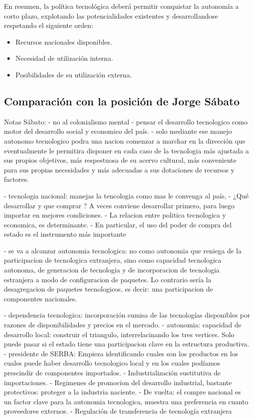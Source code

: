 En resumen, la política tecnológica deberá permitir conquistar la autonomía a corto
plazo, explotando las potencialidades existentes y desarrollandose respetando el siguiente orden:
\begin{itemize}
    \item Recursos nacionales disponibles.
    \item Necesidad de utilización interna.
    \item Posibilidades de su utilización externa.
\end{itemize}

\subsection*{Comparación con la posición de Jorge Sábato}

Notas Sábato:
- no al colonialismo mental
- pensar el desarrollo tecnologico como motor del desarrollo social y economico del país.
- solo mediante ese manejo autonomo tecnologico podra una nacion comenzar a marchar
    en la dirección que eventualmente le permitira disponer en cada caso de la tecnologia más ajustada
    a sus propios objetivos, más respestuosa de su acervo cultural, más conveniente para sus propias
    necesidades y más adecuadas a sus dotaciones de recursos y factores.

- tecnologia nacional: manejas la tencologia como mas le convenga al país,
- ¿Qué desarrollar y que comprar ? A veces conviene desarrollar primero, para luego importar en mejores condiciones.
- La relacion entre politica tecnologica y economica, es determinante.
- En particular, el uso del poder de compra del estado es el instrumento más importante

- se va a alcanzar autonomia tecnologica: no como autonomia que reniega de la participacion de tecnologica extranjera,
    sino como capacidad tecnologica autonoma, de generacion de tecnologia y de incorporacion de tecnologia estranjera a modo de configuracion de paquetes.
    Lo contrario sería la desagregacion de paquetes tecnologicos, es decir: una participacion de componentes nacionales.

- dependencia tecnologica: incorporación sumisa de las tecnologías disponibles por razones de disponibilidades y precios en el mercado.
- autonomia: capacidad de desarrollo local: construir el triangulo, interrelacinando los tres vertices. Solo puede pasar si el estado tiene
    una participacion clave en la estructura productiva.
- presidente de SERBA: Empieza identificando cuales son los productos en los cuales puede haber desarrollo
    tecnologico local y en los cuales podíamos prescindir de componentes importados.
- Industrialización sustitutiva de importaciones.
- Regimenes de promocion del desarrollo industrial, bastante protectivos: proteger a la industria naciente.
- De vuelta: el compre nacional es un factor clave para la autonomia tecnologica, muestra una preferencia en cuanto proveedores externos.
- Regulación de transferencia de tecnología extranjera

